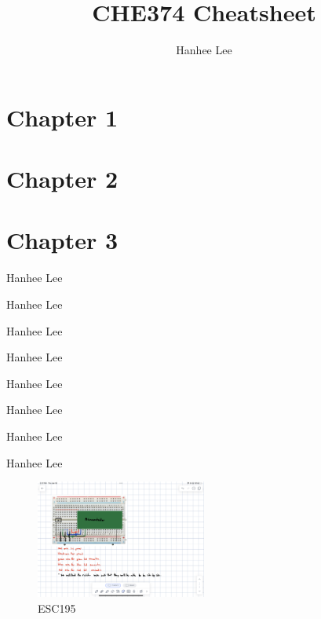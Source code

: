 \documentclass{article}
\title{CHE374 Cheatsheet}
\author{Hanhee Lee}
\begin{document}
    \maketitle
    \tableofcontents
    \section{Chapter 1}
    \section{Chapter 2}
    \section{Chapter 3}

\begin{process}
    Hanhee Lee
\end{process}

\begin{example}
    Hanhee Lee
\end{example}

\begin{definition}
    Hanhee Lee 
\end{definition}

\begin{theorem}
    Hanhee Lee
\end{theorem}

\begin{derivation}
    Hanhee Lee
\end{derivation}

\begin{intuition}
    Hanhee Lee
\end{intuition}

\begin{warning}
    Hanhee Lee
\end{warning}

\begin{summary}
    Hanhee Lee
\end{summary}

\begin{figure}[H]
    \centering
    \includegraphics[width=0.5\textwidth]{00_Images/diagram_circuit.png}
    \caption{ESC195}
\end{figure}
\end{document}
